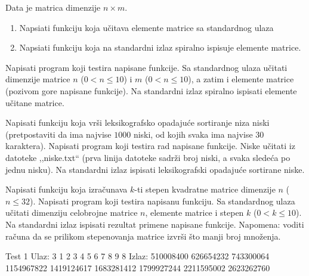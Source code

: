 \begin{Exercise}[label=325]
Data je matrica dimenzije $n \times m$.
\begin{enumerate}
\item Napsiati funkciju koja učitava elemente matrice sa standardnog ulaza
\item Napsiati funkciju koja na standardni izlaz spiralno ispisuje elemente matrice.
\end{enumerate}
Napisati program koji testira napisane funkcije. Sa standardnog
ulaza učitati dimenzije matrice $n$ ($0<n\leq 10$) i
$m$ ($0<n\leq 10$), a zatim i elemente matrice (pozivom gore
napisane funkcije). Na standardni izlaz spiralno ispisati elemente
učitane matrice.
\end{Exercise}
\begin{Answer}[ref=325]
\end{Answer}

\begin{Exercise}[label=326]
Napisati funkciju koja vrši leksikografsko opadajuće
sortiranje niza niski (pretpostaviti da ima najvise $1000$
niski, od kojih svaka ima najvise $30$ karaktera). Napisati
program koji testira rad napisane funkcije. Niske  učitati iz
datoteke ,,niske.txt`` (prva linija datoteke sadrži broj niski,
a svaka sledeća po jednu nisku). Na standardni izlaz ispisati
leksikografski opadajuće sortirane niske.
\end{Exercise}
\begin{Answer}[ref=326]
\end{Answer}

\begin{Exercise}[label=327]
Napisati funkciju koja izračunava $k$-ti stepen kvadratne
matrice dimenzije $n$ ($n \leq 32$). Napisati program koji
testira napisanu funkciju. Sa standardnog ulaza učitati
dimenziju celobrojne matrice $n$, elemente matrice i stepen
$k$ ($0<k\leq 10$). Na standardni izlaz ispisati rezultat
primene napisane funkcije. Napomena: voditi računa da se
prilikom stepenovanja matrice izvrši što manji broj
množenja.

\begin{miditest}
\begin{test}{Test 1}
Ulaz:  3
       1 2 3
       4 5 6
       7 8 9
       8
Izlaz: 510008400 626654232 743300064
       1154967822 1419124617 1683281412
       1799927244 2211595002 2623262760
\end{test}
\end{miditest}
\end{Exercise}
\begin{Answer}[ref=327]
\end{Answer}

